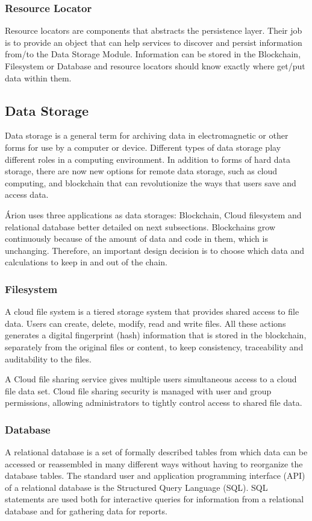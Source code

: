 \subsubsection{Resource Locator}\label{sec:ResourceLocator}

Resource locators are components that abstracts the persistence layer. Their job is to provide an object that can help services to discover and persist information from/to the Data Storage Module. Information can be stored in the Blockchain, Filesystem or Database and resource locators should know exactly where get/put data within them.

\subsection{Data Storage}\label{sec:DataStorage}
Data storage is a general term for archiving data in electromagnetic or other forms for use by a computer or device. Different types of data storage play different roles in a computing environment. In addition to forms of hard data storage, there are now new options for remote data storage, such as cloud computing, and blockchain that can revolutionize the ways that users save and access data.  

Árion uses three applications as data storages: Blockchain, Cloud filesystem and relational database better detailed on next subsections. Blockchains grow continuously because of the amount of data and code in them, which is unchanging. Therefore, an important design decision is to choose which data and calculations to keep in and out of the chain.

\subsubsection{Filesystem}\label{sec:Filesystem}
A cloud file system is a tiered storage system that provides shared access to file data. Users can create, delete, modify, read and write files. All these actions generates a digital fingerprint (hash) information that is stored in the blockchain, separately from the original files or content, to keep consistency, traceability and auditability to the files.

A Cloud file sharing service gives multiple users simultaneous access to a cloud file data set. Cloud file sharing security is managed with user and group permissions, allowing administrators to tightly control access to shared file data.

\subsubsection{Database}\label{sec:Database}
A relational database is a set of formally described tables from which data can be accessed or reassembled in many different ways without having to reorganize the database tables. The standard user and application programming interface (API) of a relational database is the Structured Query Language (SQL). SQL statements are used both for interactive queries for information from a relational database and for gathering data for reports.

